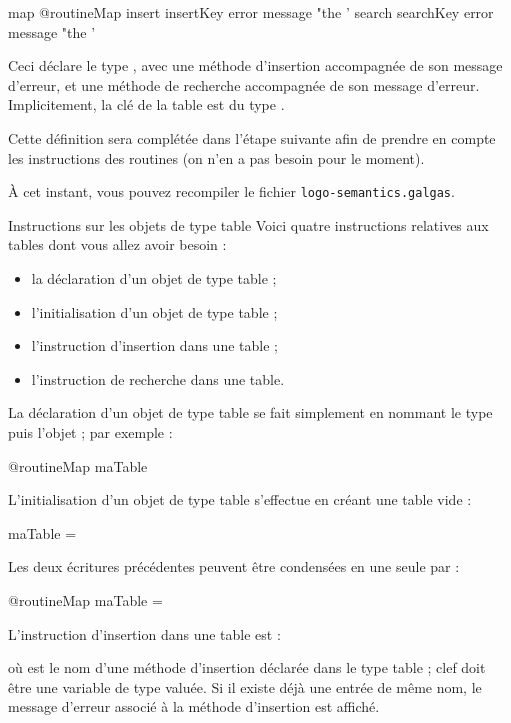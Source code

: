 \begin{galgascode}
map @routineMap {
  insert insertKey error message "the '%
  search searchKey error message "the '%
}
\end{galgascode}

Ceci déclare le type , avec une méthode d'insertion  accompagnée de son message d'erreur, et une méthode de recherche  accompagnée de son message d'erreur. Implicitement, la clé de la table est du type .

Cette définition sera complétée dans l'étape suivante afin de prendre en compte les instructions des routines (on n'en a pas besoin pour le moment).

À cet instant, vous pouvez recompiler le fichier \texttt{logo-semantics.galgas}.

Instructions sur les objets de type table
Voici quatre instructions relatives aux tables dont vous allez avoir besoin :
\begin{itemize}
  \item la déclaration d'un objet de type table ;
  \item l'initialisation d'un objet de type table ;
  \item l'instruction d'insertion dans une table ;
  \item l'instruction de recherche dans une table.
\end{itemize}

La déclaration d'un objet de type table se fait simplement en nommant le type puis l'objet ; par exemple :
\begin{galgascode}
@routineMap maTable
\end{galgascode}

L'initialisation d'un objet de type table s'effectue en créant une table vide :
\begin{galgascode}
maTable = {}
\end{galgascode}

Les deux écritures précédentes peuvent être condensées en une seule par :
\begin{galgascode}
@routineMap maTable = {}
\end{galgascode}

L'instruction d'insertion dans une table est :
\begin{galgascode}
\end{galgascode}
où  est le nom d'une méthode d'insertion déclarée dans le type table ; clef doit être une variable de type  valuée. Si il existe déjà une entrée de même nom, le message d'erreur associé à la méthode d'insertion est affiché.

